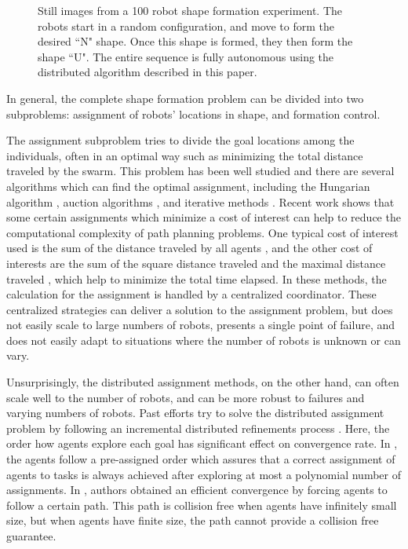 \documentclass[journal]{IEEEtran}
\begin{document}
\begin{figure}[t!]

\caption{Still images from a 100 robot shape formation experiment.  The robots start in a random configuration, and move to form the desired ``N" shape.  Once this shape is formed, they then form the shape ``U".  The entire sequence is fully autonomous using the distributed algorithm described in this paper.}
\label{fig:frames1}
\end{figure}
\captionsetup[figure]{labelformat=default}



In general, the complete shape formation problem can be divided into two subproblems: assignment of robots' locations in shape, and formation control. 

The assignment subproblem tries to divide the goal locations among the individuals, often in an optimal way such as minimizing the total distance traveled by the swarm. This problem has been well studied and there are several algorithms which can find the optimal assignment, including the Hungarian algorithm  \cite{huang}, auction algorithms  \cite{a1, a2}, and iterative methods  \cite{i1, i2}. Recent work shows that some certain assignments which minimize a cost of interest can help to reduce the computational complexity of path planning problems. One typical cost of interest used is the sum of the distance traveled by all agents \cite{e1, capt, centralized}, and the other cost of interests are the sum of the square distance traveled \cite{goalassign} and the maximal distance traveled \cite{peter}, which help to minimize the total time elapsed. In these methods, the calculation for the assignment is handled by a centralized coordinator. These centralized strategies can deliver a solution to the assignment problem, but does not easily scale to large numbers of robots, presents a single point of failure, and does not easily adapt to situations where the number of robots is unknown or can vary.  

Unsurprisingly, the distributed assignment methods, on the other hand, can often scale well to the number of robots, and can be more robust to failures \cite{particle} and varying numbers of robots. Past efforts try to solve the distributed assignment problem by following an incremental distributed refinements process \cite{nanthan, e2}. Here, the order how agents explore each goal has significant effect on convergence rate. In \cite{nanthan}, the agents follow a pre-assigned order which assures that a correct assignment of agents to tasks is always achieved after exploring at
most a polynomial number of assignments.  In  \cite{e2}, authors obtained an efficient convergence by forcing agents to follow a certain path. This path is collision free when agents have infinitely small size, but when agents have finite size, the path cannot provide a collision free guarantee.
\end{document}
